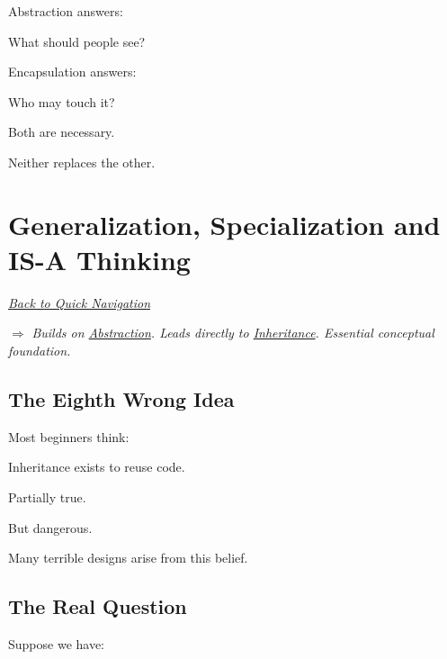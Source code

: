 \documentclass[11pt,a4paper]{book}
\begin{document}
Abstraction answers:

\begin{center}
What should people see?
\end{center}

Encapsulation answers:

\begin{center}
Who may touch it?
\end{center}

Both are necessary.

Neither replaces the other.\@

\chapter{Generalization, Specialization and IS-A Thinking}\label{chap:generalization}

\smallskip
\noindent
\hyperref[sec:quick_nav]{\emph{Back to Quick Navigation}}

\smallskip
\noindent
\textcolor{RosettaRoyalPurple}{$\Rightarrow$}
\emph{Builds on \hyperref[chap:abstraction]{Abstraction}. Leads directly to \hyperref[chap:inheritance]{Inheritance}. Essential conceptual foundation.}


\section{The Eighth Wrong Idea}

\begin{trap}

Most beginners think:

Inheritance exists to reuse code.

Partially true.

But dangerous.

Many terrible designs arise from this belief.

\end{trap}


\section{The Real Question}

Suppose we have:
\end{document}

